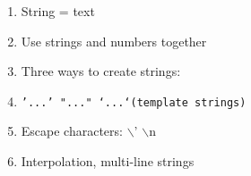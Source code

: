 \documentclass[article]{standalone}
\begin{document}
\begin{tcolorbox}[
    title= In this Lesson:
]
\begin{enumerate}
    \item String = text
    \item Use strings and numbers together
    \item Three ways to create strings:
    \item \texttt{'...' "..." `...`(template strings)}
    \item Escape characters: $\backslash$' $\backslash$n
    \item Interpolation, multi-line strings
\end{enumerate}
\end{tcolorbox}
\end{document}
